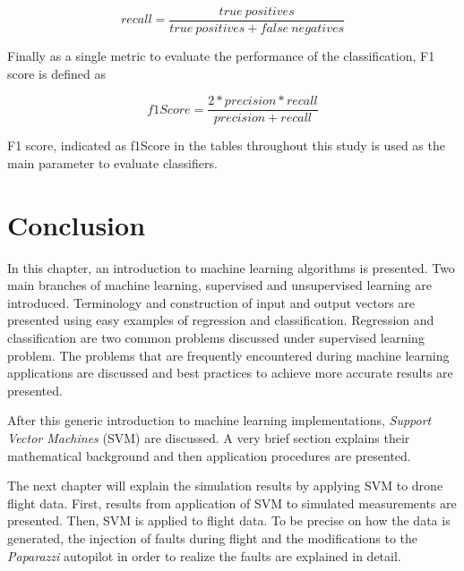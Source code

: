 \begin{equation}
recall = \frac{true \ positives}{true \ positives + false \ negatives}
\end{equation}

Finally as a single metric to evaluate the performance of the classification, F1 score is defined as

\begin{equation}
f1Score = \frac{2 * precision * recall}{precision + recall}
\end{equation}

F1 score, indicated as f1Score in the tables throughout this study is used as the main parameter to evaluate classifiers.

\section{Conclusion}
In this chapter, an introduction to machine learning algorithms is presented. 
Two main branches of machine learning, supervised and unsupervised learning are introduced. 
Terminology and construction of input and output vectors are presented using easy examples of regression and classification. 
Regression and classification are two common problems discussed under supervised learning problem. 
The problems that are frequently encountered during machine learning applications are discussed and best practices to achieve more accurate results are presented. 

After this generic introduction to machine learning implementations, \emph{Support Vector Machines} (SVM) are discussed.  
A very brief section explains their mathematical background and then application procedures are presented.

The next chapter will explain the simulation results by applying SVM to drone flight data. First, results from application of SVM to simulated measurements are presented. Then, SVM is applied to flight data. To be precise on how the data is generated, the injection of faults during flight and the modifications to the \emph{Paparazzi} autopilot in order to realize the faults are explained in detail.

